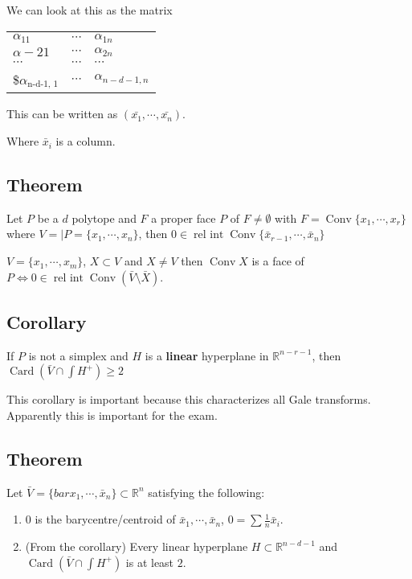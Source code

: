 \documentclass[11pt]{article}
\def\R{\mathbb{R}}
\def\relint{\operatorname{rel\ int}}
\def\conv{\operatorname{Conv}}
\def\card{\operatorname{Card}}
\begin{document}
{{{We can look at this as the matrix

\begin{center}
\begin{tabular}{lll}
\(\alpha_{11}\) & \(\cdots\) & \(\alpha_{1n}\)\\
\(\alpha-{21}\) & \(\cdots\) & \(\alpha_{2n}\)\\
\(\cdots\) & \(\cdots\) & \(\cdots\)\\
\$\(\alpha_{\text{n-d-1, 1}}\) & \(\cdots\) & \(\alpha_{n-d-1,n}\)\\
\end{tabular}
\end{center}

This can be written as \((\bar{x_1}, \cdots, \bar{x_n})\).

Where \(\bar{x}_i\) is a column.
\subsection{Theorem}
\label{sec:org6c2208a}
Let \(P\) be a \(d\) polytope and \(F\) a proper face \(P\) of \(F \neq \emptyset\)
with \(F = \conv\{x_1, \cdots, x_r\}\) where \(V = \vert P = \{x_1, \cdots,
   x_n\}\), then \(0 \in \relint \conv \{\bar{x}_{r-1}, \cdots, \bar{x}_n\}\)

\(V = \{x_1, \cdots, x_m\}\), \(X \subset V\) and \(X \neq V\) then \(\conv X\) is a
face of \(P \iff 0 \in \relint \conv(\bar{V}\setminus \bar{X})\).
\subsection{Corollary}
\label{sec:org4f62f05}
If \(P\) is not a simplex and \(H\) is a \textbf{linear} hyperplane in \(\R^{n-r-1}\),
then \(\card(\bar{V} \cap \int H^{+}) \ge 2\)

This corollary is important because this characterizes all Gale transforms.
Apparently this is important for the exam.
\subsection{Theorem}
\label{sec:orgd7970a3}
Let \(\bar{V} = \{bar{x}_1, \cdots, \bar{x}_n\} \subset \R^n\) satisfying the
following:
\begin{enumerate}
\item \(0\) is the barycentre/centroid of \(\bar{x}_1, \cdots, \bar{x}_n\), \(0 =
      \sum \frac{1}{n} \bar{x}_i\).
\item (From the corollary) Every linear hyperplane \(H \subset \R^{n-d-1}\) and
\(\card(\bar{V} \cap \int H^{+})\) is at least \(2\).


\end{enumerate}}}}
\end{document}
